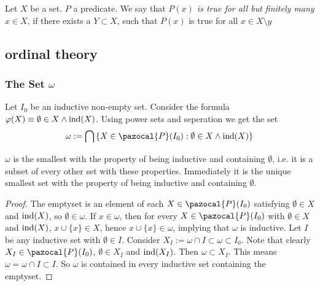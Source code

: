 \begin{definition}
    Let $X$ be a set. $P$ a predicate. We say that \textit{$P(x)$ is true for all but finitely many $x\in X$}, if there exists a $Y\subset X$, such that $P(x)$ is true for all $x\in X\setminus y$
\end{definition}
\subsection{ordinal theory}
\subsubsection{The Set $\omega$}
    \begin{definition}
        Let $I_0$ be an inductive non-empty set. Consider the formula $\varphi(X) \equiv  \emptyset\in X \wedge \mathrm{ind}(X)$. Using power sets and seperation we get the set 
        $$ \omega := \bigcap \left\{X\in \pazocal{P}(I_0) : \emptyset \in X\wedge \ind(X)\right\}$$
    \end{definition}
    \begin{lemma}
        $\omega$ is the smallest with the property of being inductive and containing $\emptyset$, i.e. it is a subset of every other set with these properties. Immediately it is the unique smallest set with the property of being inductive and containing $\emptyset$.
    \end{lemma}
    \begin{proof}
        The emptyset is an element of each $X\in\pazocal{P}(I_0)$ satisfying $\emptyset \in X$ and $\mathrm{ind}(X)$, so $\emptyset\in \omega$. If $x\in \omega$, then for every $X\in\pazocal{P}(I_0)$ with $\emptyset \in X$ and $\mathrm{ind}(X)$, $x\cup \{x\}\in X$, hence $x\cup \{x\}\in \omega$, implying that $\omega$ is inductive. Let $I$ be any inductive set with $\emptyset \in I$. Consider $X_I := \omega \cap I \subset \omega\subset I_0$. Note that clearly $X_I\in \pazocal{P}(I_0)$, $\emptyset \in X_I$ and $\mathrm{ind}(X_I)$. Then $\omega \subset X_I$. This means $\omega = \omega \cap I\subset I$. So $\omega$ is contained in every inductive set containing the emptyset.
    \end{proof}
